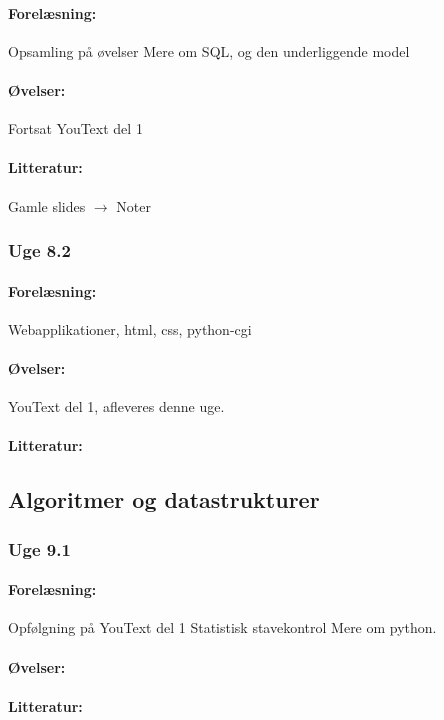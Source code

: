 \documentclass[12pt]{article}
\begin{document}
\paragraph{Forelæsning:} 
Opsamling på øvelser
Mere om SQL, og den underliggende model
\paragraph{Øvelser:}
Fortsat YouText del 1
\paragraph{Litteratur:} Gamle slides $\rightarrow$ Noter 

\subsubsection{Uge 8.2}
\paragraph{Forelæsning:} 
Webapplikationer, html, css, python-cgi
\paragraph{Øvelser:}
YouText del 1, afleveres denne uge.
\paragraph{Litteratur:}

\subsection{Algoritmer og datastrukturer}
\subsubsection{Uge 9.1}
\paragraph{Forelæsning:}
Opfølgning på YouText del 1
Statistisk stavekontrol
Mere om python.
\paragraph{Øvelser:}
\paragraph{Litteratur:}
\end{document}

